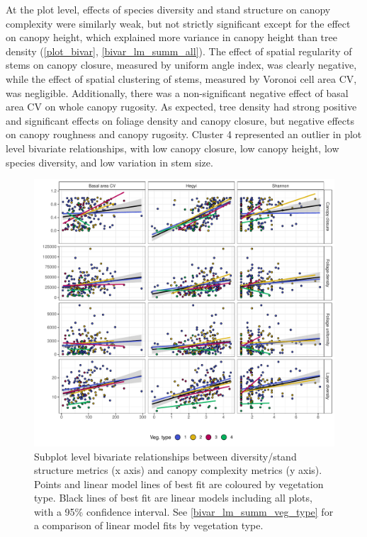 \documentclass[11pt,a4paper]{article}
\begin{document}
At the plot level, effects of species diversity and stand structure on canopy complexity were similarly weak, but not strictly significant except for the effect on canopy height, which explained more variance in canopy height than tree density (\autoref{plot_bivar}, \autoref{bivar_lm_summ_all}). The effect of spatial regularity of stems on canopy closure, measured by uniform angle index, was clearly negative, while the effect of spatial clustering of stems, measured by Voronoi cell area CV, was negligible. Additionally, there was a non-significant negative effect of basal area CV on whole canopy rugosity. As expected, tree density had strong positive and significant effects on foliage density and canopy closure, but negative effects on canopy roughness and canopy rugosity. Cluster 4 represented an outlier in plot level bivariate relationships, with low canopy closure, low canopy height, low species diversity, and low variation in stem size.



\begin{figure}
	\includegraphics[width=\linewidth]{bivar_subplot}
	\caption[Bivariate plots comparing diversity, stand structure and canopy complexity]{Subplot level bivariate relationships between diversity/stand structure metrics (x axis) and canopy complexity metrics (y axis). Points and linear model lines of best fit are coloured by vegetation type. Black lines of best fit are linear models including all plots, with a 95\% confidence interval. See \autoref{bivar_lm_summ_veg_type} for a comparison of linear model fits by vegetation type.}
	\label{subplot_bivar}
\end{figure}
\end{document}
